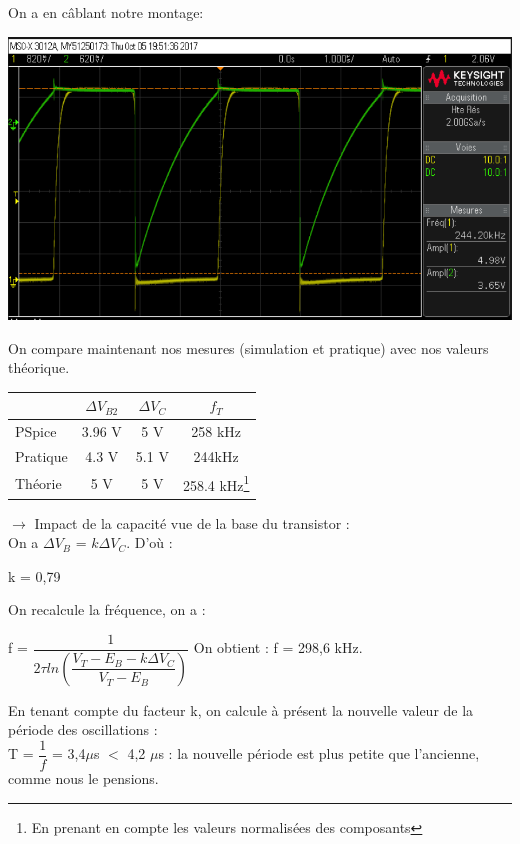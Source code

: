 \documentclass[a4paper]{report}
\begin{document}
On a en câblant notre montage:

\begin{center}
\includegraphics[width=1\textwidth]{Simu_multivib.PNG}
\end{center}

On compare maintenant nos mesures (simulation et pratique) avec nos valeurs théorique.\\

\begin{center}
\begin{tabular}{| l | c | c | c |}
\hline
 $ $ & $\Delta V_{B2}$ & $\Delta V_{C}$ & $f_T$\\
\hline
PSpice & 3.96 V & 5 V & 258 kHz   \\
\hline
Pratique & 4.3 V & 5.1 V & 244kHz   \\
\hline
Théorie & 5 V & 5 V & 258.4 kHz\footnote{En prenant en compte les valeurs normalisées des composants} \\
\hline

\end{tabular}
\end{center}
 $\rightarrow$ Impact de la capacité vue de la base du transistor : \\
 On a $\Delta V_B$ = $k\Delta V_C$. D'où :\\
 \begin{center}
 k = 0,79\\
 \end{center}

On recalcule la fréquence, on a : \\
\begin{center}
f = $\dfrac{1}{2\tau ln(\dfrac{V_T - E_B - k\Delta V_C}{V_T - E_B})}$
On obtient : f = 298,6 kHz.
\end{center}

En tenant compte du facteur k, on calcule à présent la nouvelle valeur de la période des oscillations : \\
T = $\dfrac{1}{f}$ = 3,4$\mu$s $<$ 4,2 $\mu$s : la nouvelle période est plus petite que l'ancienne, comme nous le pensions.\\
\end{document}
